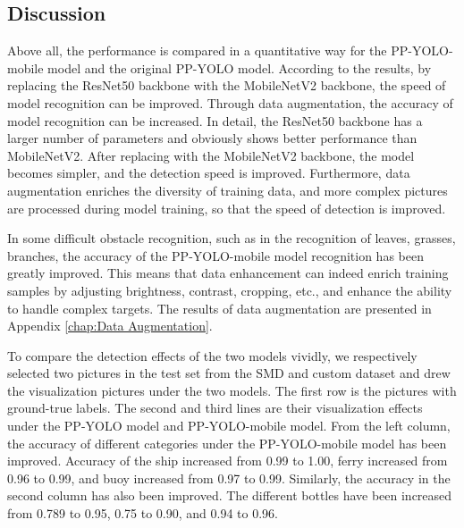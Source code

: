 \documentclass[journal,article,submit,moreauthors,pdftex]{Definitions/mdpi}
\begin{document}
\subsection{Discussion}
Above all, the performance is compared in a quantitative way for the PP-YOLO-mobile model and the original PP-YOLO model. According to the results, by replacing the ResNet50 backbone with the MobileNetV2 backbone, the speed of model recognition can be improved. Through data augmentation, the accuracy of model recognition can be increased. In detail, the ResNet50 backbone has a larger number of parameters and obviously shows better performance than MobileNetV2. After replacing with the MobileNetV2 backbone, the model becomes simpler, and the detection speed is improved. Furthermore, data augmentation enriches the diversity of training data, and more complex pictures are processed during model training, so that the speed of detection is improved.

In some difficult obstacle recognition, such as in the recognition of leaves, grasses, branches, the accuracy of the PP-YOLO-mobile model recognition has been greatly improved. This means that data enhancement can indeed enrich training samples by adjusting brightness, contrast, cropping, etc., and enhance the ability to handle complex targets. The results of data augmentation are presented in Appendix \ref{chap:Data Augmentation}. 

To compare the detection effects of the two models vividly, we respectively selected two pictures in the test set from the SMD and custom dataset and drew the visualization pictures under the two models. The first row is the pictures with ground-true labels. The second and third lines are their visualization effects under the PP-YOLO model and PP-YOLO-mobile model. 
From the left column, the accuracy of different categories under the PP-YOLO-mobile model has been improved. Accuracy of the ship increased from 0.99 to 1.00, ferry increased from 0.96 to 0.99, and buoy increased from 0.97 to 0.99.
Similarly, the accuracy in the second column has also been improved. The different bottles have been increased from 0.789 to 0.95, 0.75 to 0.90, and 0.94 to 0.96.
\end{document}

